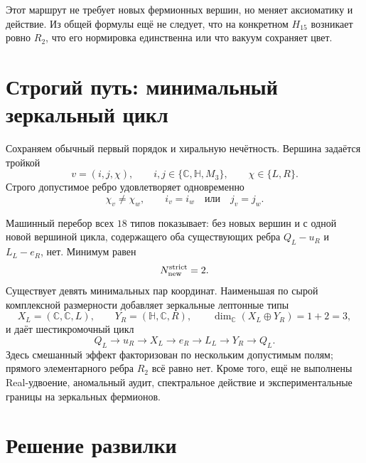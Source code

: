 Этот маршрут не требует новых фермионных вершин, но меняет аксиоматику и
действие. Из общей формулы ещё не следует, что на конкретном $H_{15}$
возникает ровно $R_2$, что его нормировка единственна или что вакуум
сохраняет цвет.

\section{Строгий путь: минимальный зеркальный цикл}

Сохраняем обычный первый порядок и хиральную нечётность. Вершина задаётся
тройкой
\begin{equation}
 v=(i,j,\chi),\qquad
 i,j\in\{\mathbb C,\mathbb H,M_3\},\qquad
 \chi\in\{L,R\}.
 \label{eq:v7-r2-branch-typed-vertex}
\end{equation}
Строго допустимое ребро удовлетворяет одновременно
\begin{equation}
 \chi_v\ne\chi_w,\qquad
 i_v=i_w\quad\text{или}\quad j_v=j_w.
 \label{eq:v7-r2-branch-strict-edge}
\end{equation}

Машинный перебор всех $18$ типов показывает: без новых вершин и с одной
новой вершиной цикла, содержащего оба существующих ребра
$Q_L-u_R$ и $L_L-e_R$, нет. Минимум равен
\begin{equation}
 N_{\rm new}^{\rm strict}=2.
 \label{eq:v7-r2-branch-minimum-new-vertices}
\end{equation}
Существует девять минимальных пар координат. Наименьшая по сырой комплексной
размерности добавляет зеркальные лептонные типы
\begin{equation}
 X_L=(\mathbb C,\mathbb C,L),\qquad
 Y_R=(\mathbb H,\mathbb C,R),\qquad
 \dim_{\mathbb C}(X_L\oplus Y_R)=1+2=3,
 \label{eq:v7-r2-branch-minimal-mirror-pair}
\end{equation}
и даёт шестикромочный цикл
\begin{equation}
 Q_L\to u_R\to X_L\to e_R\to L_L\to Y_R\to Q_L.
 \label{eq:v7-r2-branch-six-cycle}
\end{equation}
Здесь смешанный эффект факторизован по нескольким допустимым полям; прямого
элементарного ребра $R_2$ всё равно нет. Кроме того, ещё не выполнены
Real-удвоение, аномальный аудит, спектральное действие и экспериментальные
границы на зеркальных фермионов.

\section{Решение развилки}

